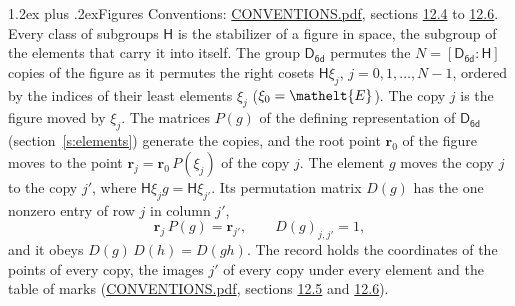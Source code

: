 \documentclass[10pt,a4paper]{article}
\makeatletter
\renewcommand\section{\@startsection{section}{1}{\z@}{-3ex plus -1ex minus -.2ex}%
  {1.2ex plus .2ex}{\normalfont\large\sffamily\bfseries\color{parttitle}}}
\numberwithin{equation}{section}
\newcommand{\eltfont}[1]{{\let\sigma\eltsigma\mathelt{#1}}}
\newcommand{\grp}[1]{\mathsf{#1}}
\newcommand{\cls}[1]{\eltfont{#1}}
\newcommand{\pointr}{\mathbf{r}}
\makeatother
\begin{document}
\section{Figures}\label{s:permutation}
Conventions: \href{../../CONVENTIONS.pdf}{CONVENTIONS.pdf}, sections \href{../../CONVENTIONS.pdf\#conv.12.4}{12.4} to \href{../../CONVENTIONS.pdf\#conv.12.6}{12.6}.
Every class of subgroups $\grp{H}$ is the stabilizer of a figure in space, the subgroup of the elements that carry it into itself. \label{n:local.orbit.size}\label{n:element.coset.least}\label{n:index.coset}The group $\grp{D_{6d}}$ permutes the $N = [\grp{D_{6d}} : \grp{H}]$ copies of the figure as it permutes the right cosets $\grp{H}\xi_j$, $j = 0, 1, \dots, N - 1$, ordered by the indices of their least elements $\xi_j$ ($\xi_0 = \cls{E}$). The copy $j$ is the figure moved by $\xi_j$. The matrices $P(g)$ of the defining representation of $\grp{D_{6d}}$ (section~\ref{s:elements}) generate the copies, and the root point $\pointr_0$ of the figure moves to the point $\pointr_j = \pointr_0\, P(\xi_j)$ of the copy $j$. \label{n:local.coset.image}The element $g$ moves the copy $j$ to the copy $j'$, where $\grp{H}\xi_j g = \grp{H}\xi_{j'}$. \label{n:local.matrix.permutation}Its permutation matrix $D(g)$ has the one nonzero entry of row $j$ in column $j'$,
\begin{equation}\label{e:perm.matrix}\pointr_j\, P(g) = \pointr_{j'}, \qquad D(g)_{j,j'} = 1,\end{equation}
and it obeys $D(g)\, D(h) = D(gh)$. The record holds the coordinates of the points of every copy, the images $j'$ of every copy under every element and the table of marks (\href{../../CONVENTIONS.pdf}{CONVENTIONS.pdf}, sections \href{../../CONVENTIONS.pdf\#conv.12.5}{12.5} and \href{../../CONVENTIONS.pdf\#conv.12.6}{12.6}).
\end{document}

